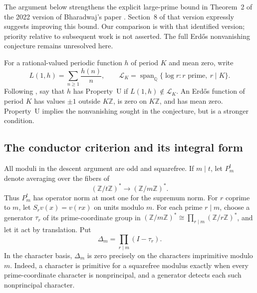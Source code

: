 \documentclass[11pt,a4paper]{article}
\theoremstyle{definition}
\theoremstyle{remark}
\numberwithin{equation}{section}
\begin{document}
The argument below strengthens the explicit large-prime bound in
Theorem~2 of the 2022 version of Bharadwaj's paper
\cite{p2:Bharadwaj2022}.  Section~8 of that version expressly suggests
improving this bound.  Our comparison is with that identified version;
priority relative to subsequent work is not asserted.  The full
Erd\H{o}s nonvanishing conjecture remains unresolved here.

For a rational-valued periodic function $h$ of period $K$ and mean
zero, write
\[
 L(1,h)=\sum_{n\ge1}\frac{h(n)}n,
 \qquad
 \mathcal L_K=\operatorname{span}_{\mathbb Q}
       \{\log r:r\text{ prime},\ r\mid K\}.
\]
Following \cite{p2:Bharadwaj2022}, say that $h$ has Property~U if
$L(1,h)\notin\mathcal L_K$.  An Erd\H{o}s function of period $K$
has values $\pm1$ outside $K\mathbb Z$, is zero on
$K\mathbb Z$, and has mean zero.  Property~U implies the
nonvanishing sought in the conjecture, but is a stronger condition.

\subsection{The conductor criterion and its integral form}

All moduli in the descent argument are odd and squarefree.  If
$m\mid t$, let $P_m^t$ denote averaging over the fibers of
\[
 (\mathbb Z/t\mathbb Z)^*\longrightarrow
 (\mathbb Z/m\mathbb Z)^*.
\]
Thus $P_m^t$ has operator norm at most one for the supremum norm.
For $r$ coprime to $m$, let $S_rv(x)=v(rx)$ on units modulo $m$.
For each prime $r\mid m$, choose a generator $\tau_r$ of its
prime-coordinate group in
$(\mathbb Z/m\mathbb Z)^*\cong\prod_{r\mid m}(\mathbb Z/r\mathbb Z)^*$,
and let it act by translation.  Put
\[
 \Delta_m=\prod_{r\mid m}(I-\tau_r).
\]
In the character basis, $\Delta_m$ is zero precisely on the
characters imprimitive modulo $m$.  Indeed, a character is primitive
for a squarefree modulus exactly when every prime-coordinate
character is nonprincipal, and a generator detects each such
nonprincipal character.
\end{document}
